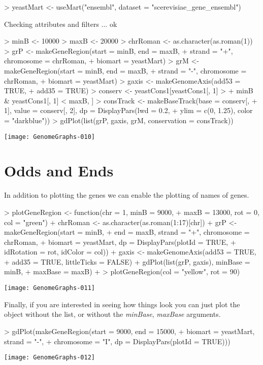 \documentclass[11pt]{article}
\begin{document}
\begin{Schunk}
\begin{Sinput}
> yeastMart <- useMart("ensembl", dataset = "scerevisiae_gene_ensembl")
\end{Sinput}
\begin{Soutput}
Checking attributes and filters ... ok
\end{Soutput}
\begin{Sinput}
> minB <- 10000
> maxB <- 20000
> chrRoman <- as.character(as.roman(1))
> grP <- makeGeneRegion(start = minB, end = maxB, 
+     strand = "+", chromosome = chrRoman, 
+     biomart = yeastMart)
> grM <- makeGeneRegion(start = minB, end = maxB, 
+     strand = "-", chromosome = chrRoman, 
+     biomart = yeastMart)
> gaxis <- makeGenomeAxis(add53 = TRUE, 
+     add35 = TRUE)
> conserv <- yeastCons1[yeastCons1[, 1] > 
+     minB & yeastCons1[, 1] < maxB, ]
> consTrack <- makeBaseTrack(base = conserv[, 
+     1], value = conserv[, 2], dp = DisplayPars(lwd = 0.2, 
+     ylim = c(0, 1.25), color = "darkblue"))
> gdPlot(list(grP, gaxis, grM, conservation = consTrack))
\end{Sinput}
\end{Schunk}
\texttt{[image: GenomeGraphs-010]}


\section{Odds and Ends}
In addition to plotting the genes we can enable the plotting of names of genes. 

\begin{Schunk}
\begin{Sinput}
> plotGeneRegion <- function(chr = 1, minB = 9000, 
+     maxB = 13000, rot = 0, col = "green") {
+     chrRoman <- as.character(as.roman(1:17)[chr])
+     grP <- makeGeneRegion(start = minB, 
+         end = maxB, strand = "+", chromosome = chrRoman, 
+         biomart = yeastMart, dp = DisplayPars(plotId = TRUE, 
+             idRotation = rot, idColor = col))
+     gaxis <- makeGenomeAxis(add53 = TRUE, 
+         add35 = TRUE, littleTicks = FALSE)
+     gdPlot(list(grP, gaxis), minBase = minB, 
+         maxBase = maxB)
+ }
> plotGeneRegion(col = "yellow", rot = 90)
\end{Sinput}
\end{Schunk}
\texttt{[image: GenomeGraphs-011]}

Finally, if you are interested in seeing how things look you can just
plot the object without the list, or without the \emph{minBase}, \emph{maxBase}
arguments. 
\begin{Schunk}
\begin{Sinput}
> gdPlot(makeGeneRegion(start = 9000, end = 15000, 
+     biomart = yeastMart, strand = "-", 
+     chromosome = "I", dp = DisplayPars(plotId = TRUE)))
\end{Sinput}
\end{Schunk}
\texttt{[image: GenomeGraphs-012]}
\end{document}
